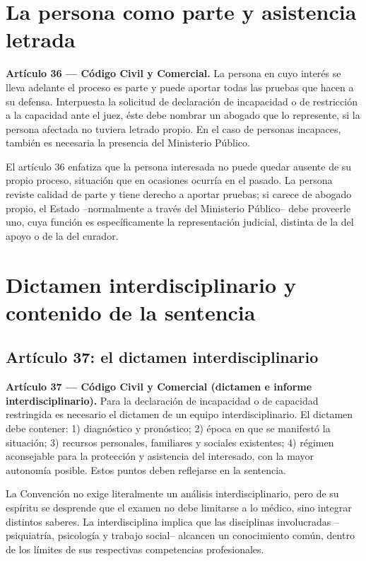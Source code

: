 \documentclass[12pt,oneside]{book}
\begin{document}
\section{La persona como parte y asistencia letrada}

\begin{important}
\textbf{Artículo 36 --- Código Civil y Comercial.} La persona en cuyo interés se lleva adelante el proceso es parte y puede aportar todas las pruebas que hacen a su defensa. Interpuesta la solicitud de declaración de incapacidad o de restricción a la capacidad ante el juez, éste debe nombrar un abogado que lo represente, si la persona afectada no tuviera letrado propio. En el caso de personas incapaces, también es necesaria la presencia del Ministerio Público.
\end{important}

El artículo 36 enfatiza que la persona interesada no puede quedar ausente de su propio proceso, situación que en ocasiones ocurría en el pasado. La persona reviste calidad de parte y tiene derecho a aportar pruebas; si carece de abogado propio, el Estado --normalmente a través del Ministerio Público-- debe proveerle uno, cuya función es específicamente la representación judicial, distinta de la del apoyo o de la del curador.

\section{Dictamen interdisciplinario y contenido de la sentencia}

\subsection{Artículo 37: el dictamen interdisciplinario}

\begin{important}
\textbf{Artículo 37 --- Código Civil y Comercial (dictamen e informe interdisciplinario).} Para la declaración de incapacidad o de capacidad restringida es necesario el dictamen de un equipo interdisciplinario. El dictamen debe contener: 1) diagnóstico y pronóstico; 2) época en que se manifestó la situación; 3) recursos personales, familiares y sociales existentes; 4) régimen aconsejable para la protección y asistencia del interesado, con la mayor autonomía posible. Estos puntos deben reflejarse en la sentencia.
\end{important}

La Convención no exige literalmente un análisis interdisciplinario, pero de su espíritu se desprende que el examen no debe limitarse a lo médico, sino integrar distintos saberes. La interdisciplina implica que las disciplinas involucradas --psiquiatría, psicología y trabajo social-- alcancen un conocimiento común, dentro de los límites de sus respectivas competencias profesionales.
\end{document}
